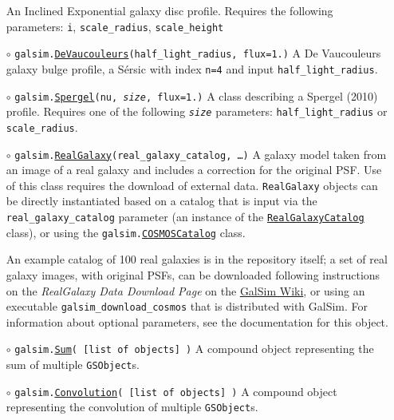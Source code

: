 \documentclass[preprint,10pt]{../../devel/modules/aastex}
\begin{document}
\begin{itemize}
    \newline
    An Inclined Exponential galaxy disc profile. Requires the
    following parameters: \texttt{i}, \texttt{scale\_radius}, \texttt{scale\_height}
\item[$\circ$]
  \texttt{galsim.}\href{http://galsim-developers.github.com/GalSim/classgalsim_1_1base_1_1_de_vaucouleurs.html}{\texttt{DeVaucouleurs}}\texttt{(half\_light\_radius, flux=1.)}
    \newline
    A De Vaucouleurs galaxy bulge profile, a S\'{e}rsic
    with index \texttt{n=4} and input \texttt{half\_light\_radius}.
\item[$\circ$]
  \texttt{galsim.}\href{http://galsim-developers.github.io/GalSim/classgalsim_1_1base_1_1_spergel.html}{\texttt{Spergel}}\texttt{(nu, \emph{size}, flux=1.)}
    \newline
    A class describing a Spergel (2010) profile.   Requires one of the
    following \texttt{\emph{size}} parameters: \texttt{half\_light\_radius} or \texttt{scale\_radius}.
\item[$\circ$]
  \texttt{galsim.}\href{http://galsim-developers.github.io/GalSim/classgalsim_1_1real_1_1_real_galaxy.html}{\texttt{RealGalaxy}}\texttt{(real\_galaxy\_catalog, \dots)}
    \newline
    A galaxy model taken from an image of a real galaxy and includes
    a correction for the original PSF.   Use of this class requires the
    download of external data.  \texttt{RealGalaxy} objects can be directly instantiated based on a catalog that
    is input via the
    \texttt{real\_galaxy\_catalog} parameter (an instance of the
    \href{http://galsim-developers.github.com/GalSim/classgalsim_1_1real_1_1_real_galaxy_catalog.html}{\texttt{RealGalaxyCatalog}}
    class), or using the \texttt{galsim.\href{http://galsim-developers.github.io/GalSim/classgalsim_1_1scene_1_1_c_o_s_m_o_s_catalog.html}{COSMOSCatalog}} class.

    An example catalog of 100 real galaxies is in the repository itself; a set of real
    galaxy images, with original PSFs, can be downloaded following instructions on the 
    \emph{RealGalaxy Data Download Page} on the
    \href{https://github.com/GalSim-developers/GalSim/wiki/RealGalaxy\%20Data}{GalSim Wiki}, or
    using an executable \texttt{galsim\_download\_cosmos} that is distributed with GalSim. For information
    about  optional parameters, see the documentation for this object.
\item[$\circ$]
  \texttt{galsim.}\href{http://galsim-developers.github.io/GalSim/classgalsim_1_1compound_1_1_sum.html}{\texttt{Sum}}\texttt{( [list of objects] )}
    \newline
    A {compound} object representing the sum of multiple \texttt{GSObject}s.
\item[$\circ$]
  \texttt{galsim.}\href{http://galsim-developers.github.io/GalSim/classgalsim_1_1compound_1_1_convolution.html}{\texttt{Convolution}}\texttt{( [list of objects] )}
    \newline
    A compound object representing the convolution of multiple \texttt{GSObject}s.
\end{itemize}
\end{document}

